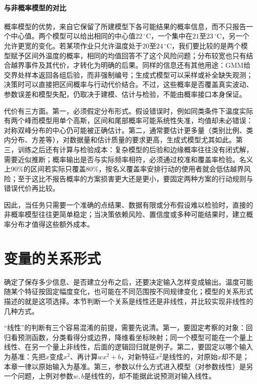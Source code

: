 \paragraph{与非概率模型的对比}

概率模型的优势，来自它保留了所建模型下各可能结果的概率信息，而不只报告一个中心值。两个模型可以给出相同的中心值$22\,^{\circ}\mathrm{C}$，一个集中在$21$至$23\,^{\circ}\mathrm{C}$，另一个允许更宽的变化。若某项作业只允许温度处于$20$至$24\,^{\circ}\mathrm{C}$，我们要比较的是两个模型赋予区间外温度的概率，相同的均值回答不了这个风险问题；分布较宽也只有结合越界事件及其代价，才转化为明确的后果。同样的信息还有其他用途：GMM给交界处样本返回各组后验，而非强制编号；生成式模型可以采样或补全缺失观测；决策时可以直接把区间概率与行动代价结合。不过，这些概率是否覆盖真实波动、参数误差和模型失配，仍取决于建模、估计与检验，不能由概率接口本身保证。

代价有三方面。第一，必须假定分布形式。假设错误时，例如同类条件下温度实际有两个峰而模型用单个高斯，区间和尾部概率可能系统性失准，均值却未必错误：对称双峰分布的中心仍可能被正确估计。第二，通常要估计更多量（类别比例、类内分布、方差等），对数据量和估计质量的要求更高，生成式模型尤其如此。第三，训练之后还有计算与检验成本：复杂模型的后验和边缘概率往往没有闭式解，需要近似推断；概率输出是否与实际频率相符，必须通过校准和覆盖率检验。名义上$90\%$的区间若实际只覆盖$80\%$，按名义覆盖率安排行动的使用者就会低估越界风险；至于这比不报告概率的方案损害更大还是更小，要固定两种方案的行动规则与错误代价再比较。

因此，当任务只需要一个准确的点结果、数据有限或分布假设难以检验时，直接的非概率模型往往更简单稳定；当决策依赖风险、置信度或多种可能结果时，建立概率分布才值得这些额外成本。

\section{变量的关系形式}
\label{sec:models-structure}

确定了保存多少信息、是否建立分布之后，还要决定输入怎样变成输出。温度可能随某个特征按固定幅度变化，也可能在不同范围按不同规律变化；模型的关系形式描述的就是这项选择。本节判断一个关系是线性还是非线性，并比较实现非线性的几种方式。

“线性”的判断有三个容易混淆的前提，需要先说清。第一，要固定考察的对象：回归看预测函数，分类看得分或边界，降维看坐标映射；同一个模型可能在一个量上线性、在另一个量上非线性，后面的逻辑回归就是例子。第二，要固定以哪个输入为基准：先把$x$变成$x^2$、再计算$wx^2+b$，对新特征$x^2$是线性的，对原始$x$却不是；本章一律以原始输入为基准。第三，参数以什么方式进入模型（对参数线性）是另一个问题，上例对参数$w,b$是线性的，却不能据此说预测对输入线性。

